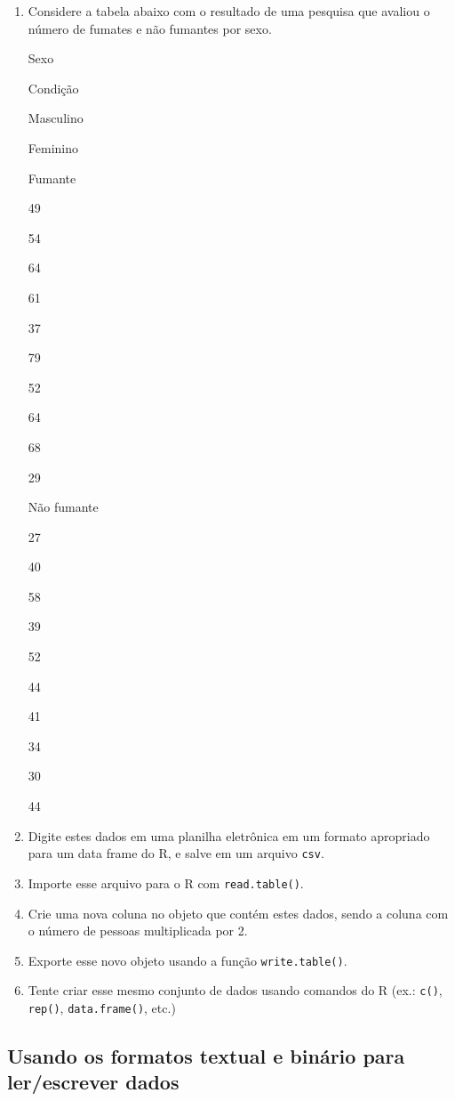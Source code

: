 \documentclass[
  10pt,
  a4paper]{book}
\providecommand{\tightlist}{%
  \setlength{\itemsep}{0pt}\setlength{\parskip}{0pt}}
\begin{document}
\begin{enumerate}
\def\labelenumi{\arabic{enumi}.}
\tightlist
\item
  Considere a tabela abaixo com o resultado de uma pesquisa que
  avaliou o número de fumates e não fumantes por sexo.

  Sexo

  Condição

  Masculino

  Feminino

  Fumante

  49

  54

  64

  61

  37

  79

  52

  64

  68

  29

  Não fumante

  27

  40

  58

  39

  52

  44

  41

  34

  30

  44
\item
  Digite estes dados em uma planilha eletrônica em um formato
  apropriado para um data frame do R, e salve em um arquivo \texttt{csv}.
\item
  Importe esse arquivo para o R com \texttt{read.table()}.
\item
  Crie uma nova coluna no objeto que contém estes dados, sendo a coluna
  com o número de pessoas multiplicada por 2.
\item
  Exporte esse novo objeto usando a função \texttt{write.table()}.
\item
  Tente criar esse mesmo conjunto de dados usando comandos do R (ex.:
  \texttt{c()}, \texttt{rep()}, \texttt{data.frame()}, etc.)
\end{enumerate}

\hypertarget{usando-os-formatos-textual-e-binuxe1rio-para-lerescrever-dados}{%
\subsection{Usando os formatos textual e binário para ler/escrever dados}\label{usando-os-formatos-textual-e-binuxe1rio-para-lerescrever-dados}}
\end{document}
